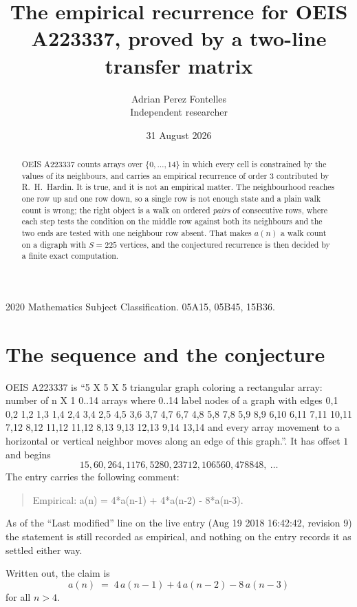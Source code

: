 \documentclass[11pt,a4paper]{article}
\title{The empirical recurrence for OEIS A223337, proved by a two-line transfer matrix}
\author{Adrian Perez Fontelles\\ \small Independent researcher}
\date{31 August 2026}
\theoremstyle{plain}
\theoremstyle{definition}
\begin{document}
\maketitle

\begin{abstract}
OEIS A223337 counts arrays over $\{0,\dots,14\}$ in which every cell is constrained by the
values of its neighbours, and carries an empirical recurrence of order $3$ contributed
by R.~H.~Hardin. It is true, and it is not an empirical matter. The neighbourhood reaches one
row up and one row down, so a single row is not enough state and a plain walk count
is wrong; the right object is a walk on ordered \emph{pairs} of consecutive rows, where
each step tests the condition on the middle row against both its neighbours and the two
ends are tested with one neighbour row absent. That makes $a(n)$ a walk count on a digraph
with $S=225$ vertices, and the conjectured recurrence is then decided by a finite exact
computation.
\end{abstract}

\noindent\small 2020 Mathematics Subject Classification. 05A15, 05B45, 15B36.\normalsize

\section{The sequence and the conjecture}

OEIS A223337 is ``5 X 5 X 5 triangular graph coloring a rectangular array: number of n X 1 0..14 arrays where 0..14 label nodes of a graph with edges 0,1 0,2 1,2 1,3 1,4 2,4 3,4 2,5 4,5 3,6 3,7 4,7 6,7 4,8 5,8 7,8 5,9 8,9 6,10 6,11 7,11 10,11 7,12 8,12 11,12 11,12 8,13 9,13 12,13 9,14 13,14 and every array movement to a horizontal or vertical neighbor moves along an edge of this graph.''. It has offset $1$ and begins
\[
15, 60, 264, 1176, 5280, 23712, 106560, 478848,\ \dots
\]
The entry carries the following comment:
\begin{quote}\small
Empirical: a(n) = 4*a(n-1) + 4*a(n-2) - 8*a(n-3).
\end{quote}
As of the ``Last modified'' line on the live entry (Aug 19 2018 16:42:42, revision 9) the statement is
still recorded as empirical, and nothing on the entry records it as settled either way.

Written out, the claim is
\begin{equation}\label{eq:conj}
a(n)\;=\;4\,a(n-1) + 4\,a(n-2) - 8\,a(n-3)
\end{equation}
for all $n>4$.
\end{document}
